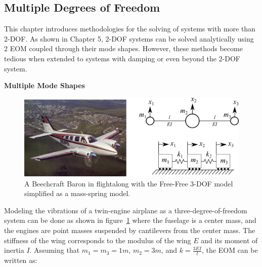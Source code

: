 \documentclass[12pt,letter]{article}
\begin{document}
	
	
	
	\subsection{Multiple Degrees of Freedom}
	
	This chapter introduces methodologies for the solving of systems with more than 2-DOF. As shown in Chapter 5, 2-DOF systems can be solved analytically using 2 EOM coupled through their mode shapes. However, these methods become tedious when extended to systems with damping or even beyond the 2-DOF system.
	
	
	
	\begin{example}
	\textbf{Multiple Mode Shapes}
	
	
	
	\begin{figure}[H]
		\centering
		\includegraphics[width=\linewidth]{../figures/mode_shape_aiplane_example}
		\caption{A Beechcraft Baron in flight\protect\footnotemark[1] along with the Free-Free 3-DOF model simplified as a mass-spring model.}
		\label{fig:mode_shape_aiplane_example}
	\end{figure}
	
	Modeling the vibrations of a twin-engine airplane as a three-degree-of-freedom system can be done as shown in figure~\ref{fig:mode_shape_aiplane_example} where the fuselage is a center mass, and the engines are point masses suspended by cantilevers from the center mass. The stiffness of the wing corresponds to the modulus of the wing $E$ and its moment of inertia $I$. 
	Assuming that $m_1=m_3=1m$, $m_2=3m$, and $k=\frac{3EI}{l}$, the EOM can be written as:
	

\end{example}
\end{document}

